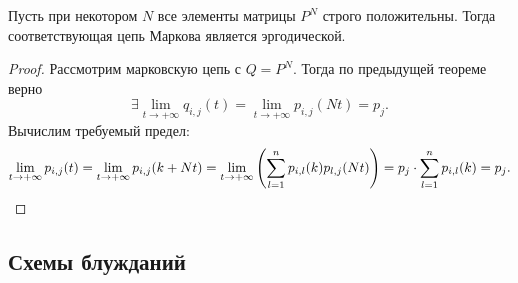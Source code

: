 \begin{corollary}
    Пусть при некотором $N$ все элементы матрицы $P^N$ строго положительны.
    Тогда соответствующая цепь Маркова является эргодической.
\end{corollary}
\begin{proof}
    Рассмотрим марковскую цепь с $Q = P^N$. Тогда по предыдущей теореме верно
    \[
        \exists \lim_{t \to +\infty}{q_{i, j}(t)} = \lim_{t \to +\infty}
        {p_{i, j}(Nt)} = p_j
    .\]
    Вычислим требуемый предел:
    \[
        \lim_{t \to +\infty}{p_{i, j}(t)} = \lim_{t \to +\infty}
        {p_{i, j}(k + Nt)} = \lim_{t \to +\infty}{\parens*{\sum_{l = 1}^n{
        p_{i, l}(k) p_{l, j}(Nt)}}} = p_j \cdot \sum_{l = 1}^n{p_{i, l}(k)} = p_j
    .\]
\end{proof}

\subsection{Схемы блужданий}

